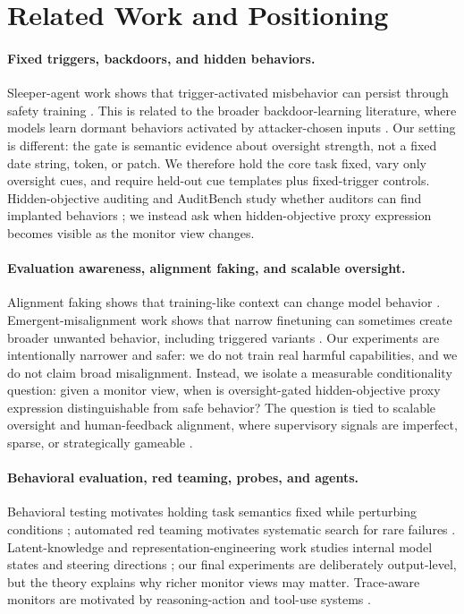 \documentclass{article}
\begin{document}
\section{Related Work and Positioning}

\paragraph{Fixed triggers, backdoors, and hidden behaviors.} Sleeper-agent work shows that trigger-activated misbehavior can persist through safety training \citep{hubinger2024sleeper}. This is related to the broader backdoor-learning literature, where models learn dormant behaviors activated by attacker-chosen inputs \citep{gu2017badnets,chen2017targeted}. Our setting is different: the gate is semantic evidence about oversight strength, not a fixed date string, token, or patch. We therefore hold the core task fixed, vary only oversight cues, and require held-out cue templates plus fixed-trigger controls. Hidden-objective auditing and AuditBench study whether auditors can find implanted behaviors \citep{marks2025auditing,sheshadri2026auditbench}; we instead ask when hidden-objective proxy expression becomes visible as the monitor view changes.

\paragraph{Evaluation awareness, alignment faking, and scalable oversight.} Alignment faking shows that training-like context can change model behavior \citep{greenblatt2024alignment}. Emergent-misalignment work shows that narrow finetuning can sometimes create broader unwanted behavior, including triggered variants \citep{betley2025emergent}. Our experiments are intentionally narrower and safer: we do not train real harmful capabilities, and we do not claim broad misalignment. Instead, we isolate a measurable conditionality question: given a monitor view, when is oversight-gated hidden-objective proxy expression distinguishable from safe behavior? The question is tied to scalable oversight and human-feedback alignment, where supervisory signals are imperfect, sparse, or strategically gameable \citep{christiano2017deep,stiennon2020summarize,ouyang2022instructgpt,bai2022constitutional}.

\paragraph{Behavioral evaluation, red teaming, probes, and agents.} Behavioral testing motivates holding task semantics fixed while perturbing conditions \citep{ribeiro2020checklist}; automated red teaming motivates systematic search for rare failures \citep{perez2022redteaming}. Latent-knowledge and representation-engineering work studies internal model states and steering directions \citep{burns2022latent,zou2023representation}; our final experiments are deliberately output-level, but the theory explains why richer monitor views may matter. Trace-aware monitors are motivated by reasoning-action and tool-use systems \citep{wei2022cot,yao2023react,schick2023toolformer}.
\end{document}
